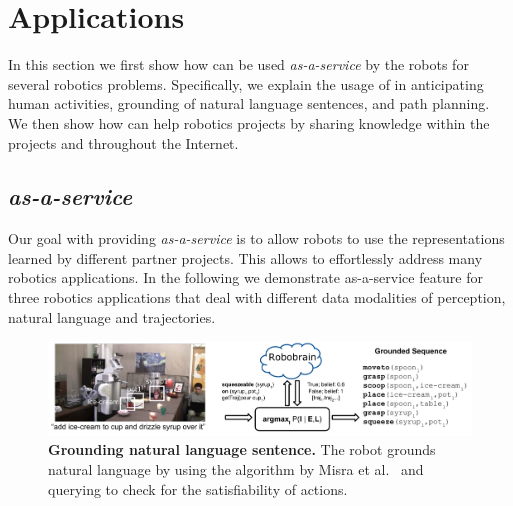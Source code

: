 \section{Applications}
\label{sec:applications}
In this section we first show how \robobrain{} can be used \textit{as-a-service} by the robots for several robotics problems. Specifically, we explain the usage of \robobrain{} in anticipating human activities, grounding of natural language sentences, and path planning. We then show how \robobrain{} can help robotics projects by sharing knowledge within the projects and throughout the Internet.

\subsection{\robobrain{} \textit{as-a-service}}
Our goal with providing \robobrain{} \textit{as-a-service} is to allow robots to use the representations learned by different partner projects. 
This 
allows \robobrain{} to effortlessly address many robotics applications. In the following we demonstrate \robobrain{} as-a-service feature for three robotics applications that deal with different data modalities of perception, natural language and trajectories.



\begin{figure}[t]
\centering
\includegraphics[width=1\linewidth]{./Image/tellmedave_robobrain_pic.pdf}
\caption{\textbf{Grounding natural language sentence.} The robot grounds natural language by using the algorithm by Misra et al.~\cite{misra2014tell} and querying \robobrain{} to check for the satisfiability of actions.}
\label{Fig:languagegrounding}
\end{figure}


